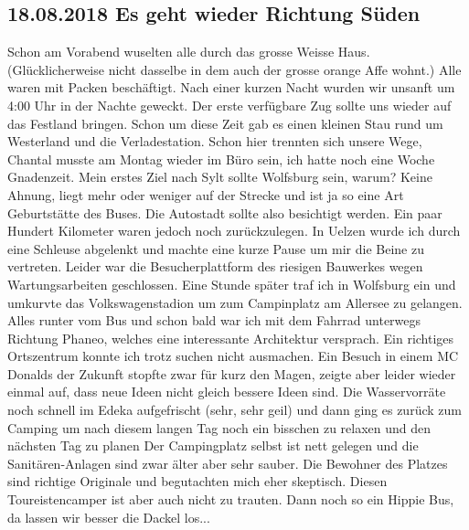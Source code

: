 \subsection{18.08.2018 Es geht wieder Richtung Süden}
Schon am Vorabend wuselten alle durch das grosse Weisse Haus.
(Glücklicherweise nicht dasselbe in dem auch der grosse orange Affe wohnt.)
Alle waren mit Packen beschäftigt.
Nach einer kurzen Nacht wurden wir unsanft um 4:00 Uhr in der Nachte geweckt.
Der erste verfügbare Zug sollte uns wieder auf das Festland bringen.
Schon um diese Zeit gab es einen kleinen Stau rund um Westerland und die Verladestation.
Schon hier trennten sich unsere Wege, Chantal musste am Montag wieder im Büro sein, ich hatte noch eine Woche Gnadenzeit.
Mein erstes Ziel nach Sylt sollte Wolfsburg sein, warum?
Keine Ahnung, liegt mehr oder weniger auf der Strecke und ist ja so eine Art Geburtstätte des Buses.
Die Autostadt sollte also besichtigt werden.
Ein paar Hundert Kilometer waren jedoch noch zurückzulegen.
In Uelzen wurde ich durch eine Schleuse abgelenkt und machte eine kurze Pause um mir die Beine zu vertreten.
Leider war die Besucherplattform des riesigen Bauwerkes wegen Wartungsarbeiten geschlossen. 
Eine Stunde später traf ich in Wolfsburg ein und umkurvte das Volkswagenstadion um zum Campinplatz am Allersee zu gelangen.
Alles runter vom Bus und schon bald war ich mit dem Fahrrad unterwegs Richtung Phaneo, welches eine interessante Architektur versprach.
Ein richtiges Ortszentrum konnte ich trotz suchen nicht ausmachen.
Ein Besuch in einem MC Donalds der Zukunft stopfte zwar für kurz den Magen, zeigte aber leider wieder einmal auf, dass neue Ideen nicht gleich bessere Ideen sind.
Die Wasservorräte noch schnell im Edeka aufgefrischt (sehr, sehr geil) und dann ging es zurück zum Camping um nach diesem langen Tag noch ein bisschen zu relaxen und den nächsten Tag zu planen
Der Campingplatz selbst ist nett gelegen und die Sanitären-Anlagen sind zwar älter aber sehr sauber.
Die \glqq Bewohner\grqq{} des Platzes sind richtige Originale und begutachten mich eher skeptisch. 
Diesen Toureistencamper ist aber auch nicht zu trauten.
Dann noch so ein Hippie Bus, da lassen wir besser die Dackel los...

